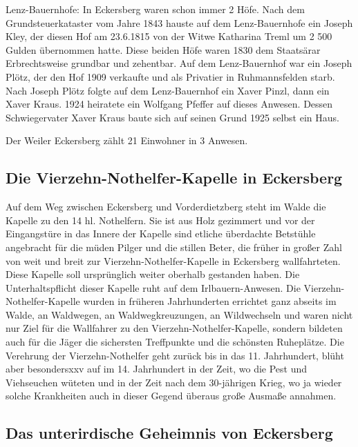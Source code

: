 \documentclass[12pt,a4pager]{book}
\begin{document}
Lenz-Bauernhofe: In Eckersberg waren schon immer 2 Höfe. Nach dem
Grundsteuerkataster vom Jahre 1843 hauste auf dem Lenz-Bauernhofe ein Joseph
Kley, der diesen Hof am 23.6.1815 von der Witwe Katharina Treml um 2 500 Gulden
übernommen hatte. Diese beiden Höfe waren 1830 dem Staatsärar Erbrechtsweise
grundbar und zehentbar. Auf dem Lenz-Bauernhof war ein Joseph Plötz, der den Hof
1909 verkaufte und als Privatier in Ruhmannsfelden starb. Nach Joseph Plötz
folgte auf dem Lenz-Bauernhof ein Xaver Pinzl, dann ein Xaver Kraus. 1924
heiratete ein Wolfgang Pfeffer auf dieses Anwesen. Dessen Schwiegervater Xaver
Kraus baute sich auf seinen Grund 1925 selbst ein Haus.

Der Weiler Eckersberg zählt 21 Einwohner in 3 Anwesen.

\subsection{Die Vierzehn-Nothelfer-Kapelle in Eckersberg}

Auf dem Weg zwischen Eckersberg und Vorderdietzberg steht im Walde die Kapelle
zu den 14 hl. Nothelfern. Sie ist aus Holz gezimmert und vor der Eingangstüre in
das Innere der Kapelle sind etliche überdachte Betstühle angebracht für die
müden Pilger und die stillen Beter, die früher in großer Zahl von weit und breit
zur Vierzehn-Nothelfer-Kapelle in Eckersberg wallfahrteten. Diese Kapelle soll
ursprünglich weiter oberhalb gestanden haben. Die Unterhaltspflicht dieser
Kapelle ruht auf dem Irlbauern-Anwesen. Die Vierzehn-Nothelfer-Kapelle wurden in
früheren Jahrhunderten errichtet ganz abseits im Walde, an Waldwegen, an
Waldwegkreuzungen, an Wildwechseln und waren nicht nur Ziel für die Wallfahrer
zu den Vierzehn-Nothelfer-Kapelle, sondern bildeten auch für die Jäger die
sichersten Treffpunkte und die schönsten Ruheplätze. Die Verehrung der
Vierzehn-Nothelfer geht zurück bis in das 11. Jahrhundert, blüht aber
besondersxxv auf im 14. Jahrhundert in der Zeit, wo die Pest und Viehseuchen
wüteten und in der Zeit nach dem 30-jährigen Krieg, wo ja wieder solche
Krankheiten auch in dieser Gegend überaus große Ausmaße annahmen.

\subsection{Das unterirdische Geheimnis von Eckersberg}
\end{document}
